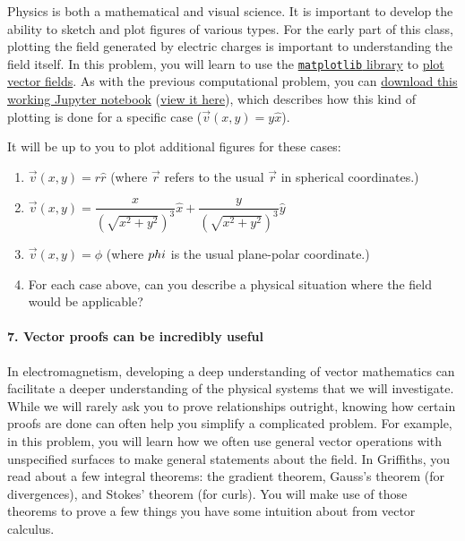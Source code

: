 \documentclass[11pt]{article}
\def\tightlist{}
\begin{document}
Physics is both a mathematical and visual science. It is important to
develop the ability to sketch and plot figures of various types. For the
early part of this class, plotting the field generated by electric
charges is important to understanding the field itself. In this problem,
you will learn to use the
\href{http://matplotlib.org}{\texttt{matplotlib} library} to
\href{http://matplotlib.org/examples/pylab_examples/quiver_demo.html}{plot
vector fields}. As with the previous computational problem, you can
\href{../jupyter/HW1-VectorFieldsProblem.ipynb}{download this working
Jupyter notebook}
(\href{https://github.com/dannycab/phy481msu/blob/gh-pages/jupyter/HW1-VectorFieldsProblem.ipynb}{view
it here}), which describes how this kind of plotting is done for a
specific case (\(\vec{v}(x,y)=y\hat{x}\)).

It will be up to you to plot additional figures for these cases:

\begin{enumerate}
\def\labelenumi{\arabic{enumi}.}
\tightlist
\item
  \(\vec{v}(x,y)=r\hat{r}\) (where \(\vec{r}\) refers to the usual
  \(\vec{r}\) in spherical coordinates.)
\item
  \(\vec{v}(x,y) = \dfrac{x}{(\sqrt{x^2+y^2})^3}\hat{x}+\dfrac{y}{(\sqrt{x^2+y^2})^3}\hat{y}\)
\item
  \(\vec{v}(x,y) = \hat{\phi}\) (where \(\\phi\) is the usual
  plane-polar coordinate.)
\item
  For each case above, can you describe a physical situation where the
  field would be applicable?
\end{enumerate}

\paragraph{7. Vector proofs can be incredibly
useful}\label{vector-proofs-can-be-incredibly-useful}

In electromagnetism, developing a deep understanding of vector
mathematics can facilitate a deeper understanding of the physical
systems that we will investigate. While we will rarely ask you to prove
relationships outright, knowing how certain proofs are done can often
help you simplify a complicated problem. For example, in this problem,
you will learn how we often use general vector operations with
unspecified surfaces to make general statements about the field. In
Griffiths, you read about a few integral theorems: the gradient theorem,
Gauss's theorem (for divergences), and Stokes' theorem (for curls). You
will make use of those theorems to prove a few things you have some
intuition about from vector calculus.
\end{document}
